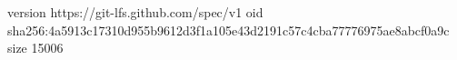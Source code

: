 version https://git-lfs.github.com/spec/v1
oid sha256:4a5913c17310d955b9612d3f1a105e43d2191c57c4cba77776975ae8abcf0a9c
size 15006
